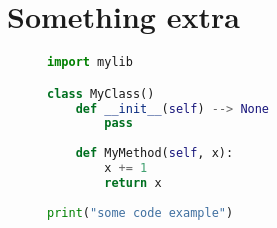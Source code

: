 \documentclass[1-ambra-tesi.tex]{subfiles}
\begin{document}
\begin{appendices}
\label{appendix}


\chapter{Something extra}
\label{app:extra}
\lipsum[1]

\begin{figure}[ht]
\centering
\begin{lstlisting}[language=Python, label={lst:config-xml}, caption={Fancy code.}]
import mylib

class MyClass()
    def __init__(self) --> None
        pass
        
    def MyMethod(self, x):
        x += 1
        return x 
        
print("some code example")
\end{lstlisting}
\end{figure}

\lipsum[2]


\end{appendices}
\end{document}
